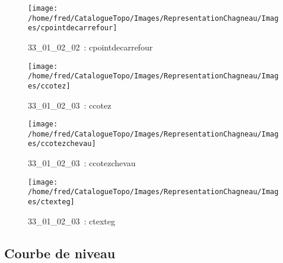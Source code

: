 \documentclass[12pt,titlepage]{book}
\begin{document}
\begin{figure}[h!]
\begin{minipage}[t]{3cm}
    \begin{center}
      \texttt{[image: /home/fred/CatalogueTopo/Images/RepresentationChagneau/Images/cpointdecarrefour]}
      \caption[~33\_01\_02\_02]{\small{33\_01\_02\_02~:} \tiny{cpointdecarrefour}}\label{cpointdecarrefour}
    \end{center}
  \end{minipage}
  \begin{minipage}[t]{3cm}
    \begin{center}
      \texttt{[image: /home/fred/CatalogueTopo/Images/RepresentationChagneau/Images/ccotez]}
      \caption[~33\_01\_02\_03]{\small{33\_01\_02\_03~:} \tiny{ccotez}}\label{ccotez}
    \end{center}
  \end{minipage}
  \begin{minipage}[t]{3cm}
    \begin{center}
      \texttt{[image: /home/fred/CatalogueTopo/Images/RepresentationChagneau/Images/ccotezchevau]}
      \caption[~33\_01\_02\_03]{\small{33\_01\_02\_03~:} \tiny{ccotezchevau}}\label{ccotezchevau}
    \end{center}
  \end{minipage}
  \begin{minipage}[t]{3cm}
    \begin{center}
      \texttt{[image: /home/fred/CatalogueTopo/Images/RepresentationChagneau/Images/ctexteg]}
      \caption[~33\_01\_02\_03]{\small{33\_01\_02\_03~:} \tiny{ctexteg}}\label{ctexteg}
    \end{center}
  \end{minipage}
\end{figure}


\subsection{Courbe de niveau}
\noindent
\vspace{\baselineskip}
\end{document}
